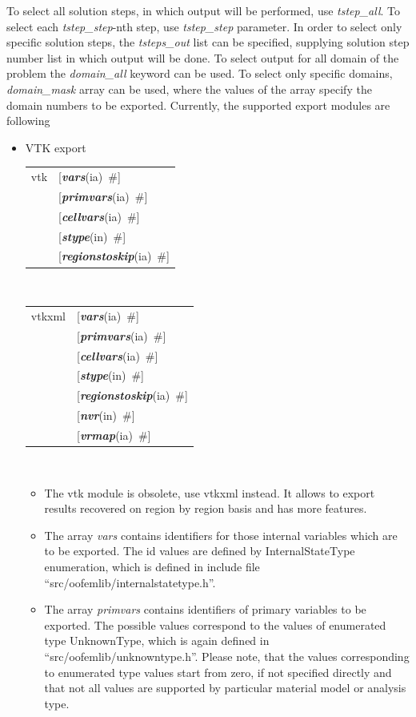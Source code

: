 \documentclass[a4paper]{article}
\makeatletter
\newcommand{\param}[1]{{\em #1}}
\newcommand{\keywordnotype}[1]{\mbox{{\it{\bf{#1}}}}}
\newcommand{\keyword}[2]{\mbox{{\keywordnotype{#1}\tiny (#2)}}}
\newcommand{\field}[2]{\mbox{\keyword{#1}{#2}~\#}}
\newcommand{\optField}[2]{\mbox{[\field{#1}{#2}]}}
\newenvironment{record}[1][]{\begin{tabular}{|ll}}{\end{tabular}\\}
\newcommand{\recentry}[2]{{#1}&{#2}\\}
\newcounter{rcc}
\newenvironment{record}[1][\textwidth]{\setcounter{rcc}{0}\begin{tabular*}{#1}{|ll@{\extracolsep{\fill}}r}}{\end{tabular*}\\}
\newcommand{\recentry}[2]{\ifthenelse{\value{rcc}>0}{&$\backslash$ \\}{\setcounter{rcc}{1}}{#1}&{#2}}
\makeatother
\begin{document}
To select all solution steps, in which output will be performed, use
\param{tstep\_all}. To select each \param{tstep\_step}-nth step, use
\param{tstep\_step} parameter. In order to select only specific
solution steps, the \param{tsteps\_out} list can be specified,
supplying solution step number list in which output will be done.
To select output for all domain of the problem the \param{domain\_all}
keyword can be used. To select only specific domains,
\param{domain\_mask} array can be used, where the values of the array
specify the domain numbers to be exported.
Currently, the supported export modules are following
\begin{itemize}
\item VTK export

\begin{record}[0.9\textwidth]
    \recentry{vtk}{\optField{vars}{ia}} \recentry{}{\optField{primvars}{ia}}\recentry{}{\optField{cellvars}{ia}}
    \recentry{}{\optField{stype}{in}} \recentry{}{\optField{regionstoskip}{ia}}
  \end{record}


\begin{record}[0.9\textwidth]
    \recentry{vtkxml}{\optField{vars}{ia}} \recentry{}{\optField{primvars}{ia}}\recentry{}{\optField{cellvars}{ia}}
    \recentry{}{\optField{stype}{in}} \recentry{}{\optField{regionstoskip}{ia}}
    \recentry{}{\optField{nvr}{in}} \recentry{}{\optField{vrmap}{ia}}
  \end{record}

\begin{itemize}
\item The vtk module is obsolete, use vtkxml instead. It allows to export results recovered on region by region basis and has more features.

\item The array \param{vars} contains identifiers for those internal
variables which are to be exported. The id values are defined by
InternalStateType enumeration, which is defined in include file
``src/oofemlib/internal\-statetype.h''.

\item The array \param{primvars}
contains identifiers of primary variables to be exported.
The possible values correspond to the values of enumerated type
UnknownType, which is again defined in ``src/oofemlib/unknown\-type.h''.
Please note, that the values corresponding to enumerated type values
start from zero, if not specified directly and that not all values are
supported by particular material model or analysis type.


\end{itemize}
\end{itemize}
\end{document}
